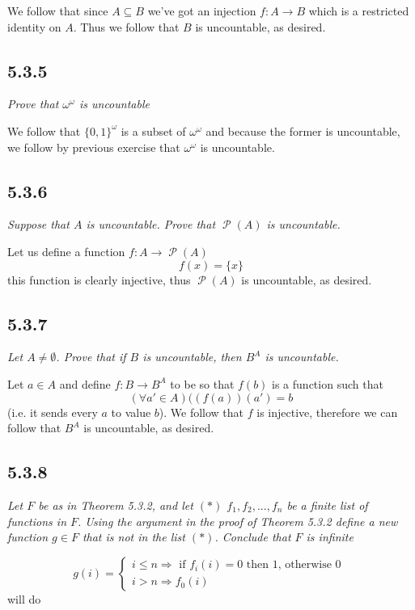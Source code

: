 \documentclass[11pt,oneside,titlepage]{book}
\DeclareMathOperator \pow {\mathcal {P}}
\DeclareMathOperator \ra {\Rightarrow}
\begin{document}
We follow that since $A \subseteq B$ we've got an injection $f: A \to B$
which is a restricted identity on $A$. Thus we follow that $B$ is uncountable, as desired.

\subsection*{5.3.5}

\textit{Prove that $\omega^\omega$ is uncountable}

We follow that $\{0, 1\}^\omega$ is a subset of $\omega^{\omega}$ and because the former
is uncountable, we follow by previous exercise that $\omega^{\omega}$ is uncountable.

\subsection*{5.3.6}

\textit{Suppose that $A$ is uncountable. Prove that $\pow(A)$ is uncountable.}

Let us define a function $f: A \to \pow(A)$
$$f(x) = \{x\}$$
this function is clearly injective, thus $\pow(A)$ is uncountable, as desired.

\subsection*{5.3.7}

\textit{Let $A \neq \emptyset$. Prove that if $B$ is uncountable, then $B^A$ is uncountable.}

Let $a \in A$ and define $f: B \to B^A$ to be so that $f(b)$ is a function such that
$$(\forall a'\in A)((f(a))(a') = b$$
(i.e. it sends every $a$ to value $b$). We follow that $f$ is injective, therefore
we can follow that $B^A$ is uncountable, as desired.

\subsection*{5.3.8}

\textit{Let $F$ be as in Theorem 5.3.2, and let $(*)$ $f_1, f_2, ..., f_n$ be a finite
  list of functions in $F$. Using the argument in the proof of Theorem 5.3.2
  define a new function $g \in F$ that is not in the list $(*)$. Conclude that $F$ is infinite}

$$
g(i) =
\begin{cases}
  i \leq n \ra \text{ if $f_i(i) = 0$ then 1, otherwise 0 } \\
  i > n \ra f_0(i)
\end{cases}
$$
will do
\end{document}
